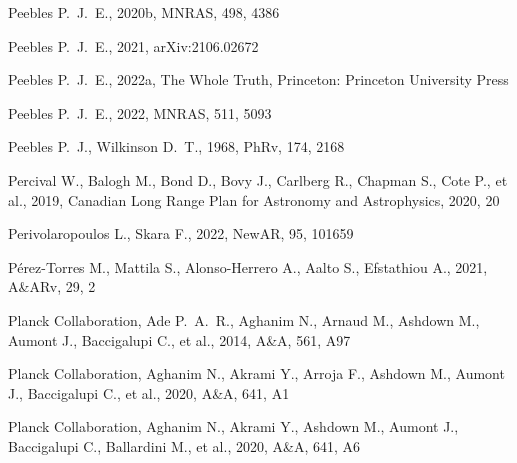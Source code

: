\documentclass[fleqn,12pt]{article}
\begin{document}
\begin{thebibliography}{}
 Peebles P.~J.~E., 2020b, MNRAS, 498, 4386

 Peebles P.~J.~E., 2021, arXiv:2106.02672

 Peebles P.~J.~E., 2022a, The Whole Truth, Princeton: Princeton University Press

 Peebles P.~J.~E., 2022, MNRAS, 511, 5093

 Peebles P.~J., Wilkinson D.~T., 1968, PhRv, 174, 2168

 Percival W., Balogh M., Bond D., Bovy J., Carlberg R., Chapman S., Cote P., et al., 2019,  
Canadian Long Range Plan for Astronomy and Astrophysics, 2020, 20

 Perivolaropoulos L., Skara F., 2022, NewAR, 95, 101659


 P{\'e}rez-Torres M., Mattila S., Alonso-Herrero A., Aalto S., Efstathiou A., 2021, A\&ARv, 29, 2


 Planck Collaboration, Ade P.~A.~R., Aghanim N., Arnaud M., Ashdown M., Aumont J., Baccigalupi C., et al., 2014, A\&A, 561, A97

 Planck Collaboration, Aghanim N., Akrami Y., Arroja F., Ashdown M., Aumont J., Baccigalupi C., et al., 2020, A\&A, 641, A1

 Planck Collaboration, Aghanim N., Akrami Y., Ashdown M., Aumont J., Baccigalupi C., Ballardini M., et al., 2020, A\&A, 641, A6


\end{thebibliography}
\end{document}
